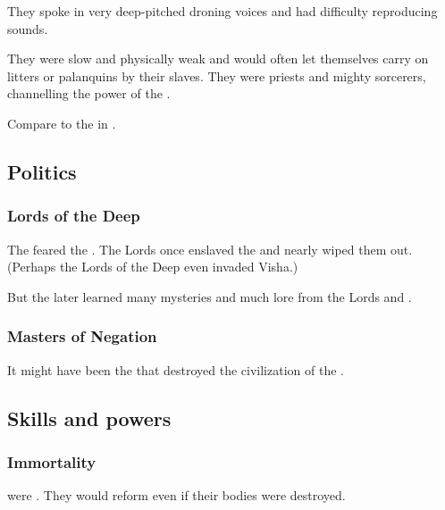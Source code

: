 They spoke in very deep-pitched droning voices and had difficulty reproducing \humanoid sounds.

They were slow and physically weak and would often let themselves carry on litters or palanquins by their \glithid slaves. 
They were priests and mighty sorcerers, channelling the power of the \moongods.

Compare to the  in \cite[p.444]{HPLovecraft:TheDreamQuestofUnknownKadath}.









\subsection{Politics}





\subsubsection{Lords of the Deep}
The \shugul feared the .
The Lords once enslaved the \shugul and nearly wiped them out. 
(Perhaps the Lords of the Deep even invaded Visha.) 

But the \shugul later learned many mysteries and much lore from the Lords and .





\subsubsection{Masters of Negation}
It might have been the  that destroyed the civilization of the \shugul.









\subsection{Skills and powers}





\subsubsection{Immortality}
\Shugul were . 
They would reform even if their bodies were destroyed. 





